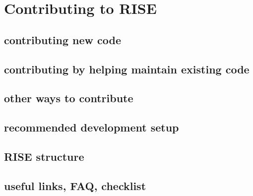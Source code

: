 \documentclass[letterpaper,10pt,english]{sphinxmanual}
\begin{document}
\chapter{Contributing to RISE}
\label{contributing:contributing-to-rise}\label{contributing::doc}

\section{contributing new code}
\label{contributing:contributing-new-code}

\section{contributing by helping maintain existing code}
\label{contributing:contributing-by-helping-maintain-existing-code}

\section{other ways to contribute}
\label{contributing:other-ways-to-contribute}

\section{recommended development setup}
\label{contributing:recommended-development-setup}

\section{RISE structure}
\label{contributing:rise-structure}

\section{useful links, FAQ, checklist}
\label{contributing:useful-links-faq-checklist}
\end{document}
